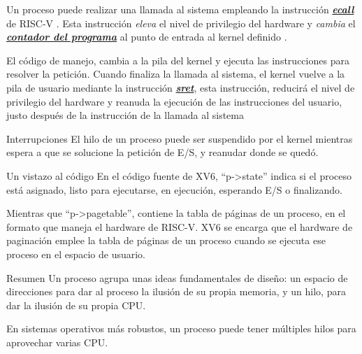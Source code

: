 \documentclass{libs/ufc_format}
\begin{document}
\begin{frame}{}
  Un proceso puede realizar una llamada al sistema empleando la instrucción \href{https://jborza.com/emulation/2021/04/22/ecalls-and-syscalls.html}{\textit{\textbf{ecall}}} de RISC-V \cite{xv6_book}. Esta instrucción \emph{eleva} el nivel de privilegio del hardware y \emph{cambia} el \href{https://en.wikipedia.org/wiki/Program_counter}{\textit{\textbf{contador del programa}}} al punto de entrada al kernel definido \cite{xv6_book}.

  \vspace{0.2cm}

  El código de manejo, cambia a la pila del kernel y ejecuta las instrucciones para resolver la petición. Cuando finaliza la llamada al sistema, el kernel vuelve a la pila de usuario mediante la instrucción \href{https://jborza.com/post/2021-04-04-riscv-supervisor-mode/}{\textit{\textbf{sret}}}, esta instrucción, reducirá el nivel de privilegio del hardware y reanuda la ejecución de las instrucciones del usuario, justo después de la instrucción de la llamada al sistema \cite{xv6_book}

  \begin{block}{Interrupciones}
    El hilo de un proceso puede ser suspendido por el kernel mientras espera a que se solucione la petición de E/S, y reanudar donde se quedó.
  \end{block}
\end{frame}
\begin{frame}{Un vistazo al código}
  En el código fuente de XV6, “p->state” indica si el proceso está asignado, listo para ejecutarse, en ejecución, esperando E/S o finalizando. \cite{xv6_book}

  \vspace{0.3cm}

  Mientras que “p->pagetable”, contiene la tabla de páginas de un proceso, en el formato que maneja el hardware de RISC-V. XV6 se encarga que el hardware de paginación emplee la tabla de páginas de un proceso cuando se ejecuta ese proceso en el espacio de usuario.  \cite{xv6_book}
\end{frame}
\begin{frame}{Resumen}
  Un proceso agrupa unas ideas fundamentales de diseño: un espacio de direcciones para dar al proceso la ilusión de su propia memoria, y un hilo, para dar la ilusión de su propia CPU. \cite{xv6_book}

  \vspace{0.3cm}

  En sistemas operativos más robustos, un proceso puede tener múltiples hilos para aprovechar varias CPU.
\end{frame}
\end{document}

